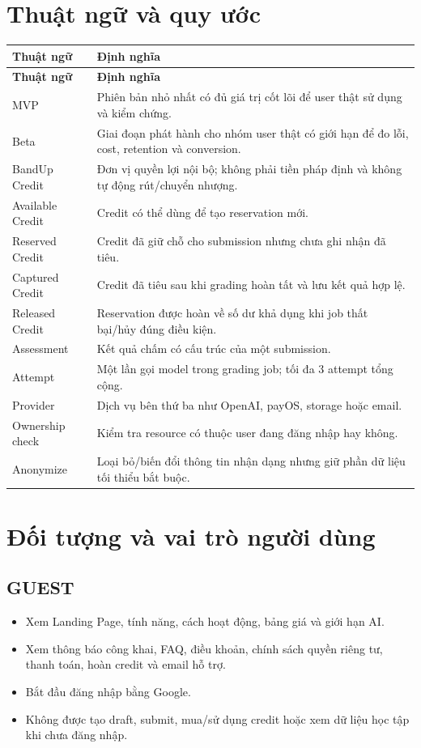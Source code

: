 \documentclass[11pt,a4paper]{article}
\begin{document}
\section{Thuật ngữ và quy ước}
\small
\setlength{\tabcolsep}{4pt}
\renewcommand{\arraystretch}{1.18}
\begin{longtable}{|P{0.24\textwidth}|P{0.68\textwidth}|}
\hline
\textbf{Thuật ngữ} & \textbf{Định nghĩa} \\ \hline
\endfirsthead
\hline
\textbf{Thuật ngữ} & \textbf{Định nghĩa} \\ \hline
\endhead
MVP & Phiên bản nhỏ nhất có đủ giá trị cốt lõi để user thật sử dụng và kiểm chứng. \\ \hline
Beta & Giai đoạn phát hành cho nhóm user thật có giới hạn để đo lỗi, cost, retention và conversion. \\ \hline
BandUp Credit & Đơn vị quyền lợi nội bộ; không phải tiền pháp định và không tự động rút/\allowbreak{}chuyển nhượng. \\ \hline
Available Credit & Credit có thể dùng để tạo reservation mới. \\ \hline
Reserved Credit & Credit đã giữ chỗ cho submission nhưng chưa ghi nhận đã tiêu. \\ \hline
Captured Credit & Credit đã tiêu sau khi grading hoàn tất và lưu kết quả hợp lệ. \\ \hline
Released Credit & Reservation được hoàn về số dư khả dụng khi job thất bại/\allowbreak{}hủy đúng điều kiện. \\ \hline
Assessment & Kết quả chấm có cấu trúc của một submission. \\ \hline
Attempt & Một lần gọi model trong grading job; tối đa 3 attempt tổng cộng. \\ \hline
Provider & Dịch vụ bên thứ ba như OpenAI, payOS, storage hoặc email. \\ \hline
Ownership check & Kiểm tra resource có thuộc user đang đăng nhập hay không. \\ \hline
Anonymize & Loại bỏ/\allowbreak{}biến đổi thông tin nhận dạng nhưng giữ phần dữ liệu tối thiểu bắt buộc. \\ \hline
\end{longtable}
\normalsize
\section{Đối tượng và vai trò người dùng}
\subsection{GUEST}
\begin{itemize}
  \item Xem Landing Page, tính năng, cách hoạt động, bảng giá và giới hạn AI.
  \item Xem thông báo công khai, FAQ, điều khoản, chính sách quyền riêng tư, thanh toán, hoàn credit và email hỗ trợ.
  \item Bắt đầu đăng nhập bằng Google.
  \item Không được tạo draft, submit, mua/\allowbreak{}sử dụng credit hoặc xem dữ liệu học tập khi chưa đăng nhập.
\end{itemize}
\end{document}
